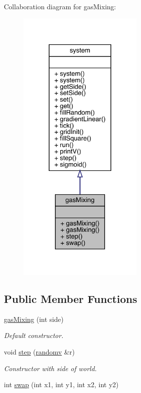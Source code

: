 Collaboration diagram for gas\+Mixing\+:
\nopagebreak
\begin{figure}[H]
\begin{center}
\leavevmode
\includegraphics[width=175pt]{classgas_mixing__coll__graph}
\end{center}
\end{figure}
\subsection*{Public Member Functions}
\begin{DoxyCompactItemize}
\item 
\mbox{\label{classgas_mixing_a5600907d75cc72807e733e34e6fae5b1}} 
\hyperlink{classgas_mixing_a5600907d75cc72807e733e34e6fae5b1}{gas\+Mixing} (int side)
\begin{DoxyCompactList}\small\item\em Default constructor. \end{DoxyCompactList}\item 
void \hyperlink{classgas_mixing_acfd89f15487611dd77da9664642a06c6}{step} (\hyperlink{classrandomv}{randomv} \&r)
\begin{DoxyCompactList}\small\item\em Constructor with side of world. \end{DoxyCompactList}\item 
int \hyperlink{classgas_mixing_a99a14c1a13ee0ba938f4c1e22ad491b6}{swap} (int x1, int y1, int x2, int y2)
\end{DoxyCompactItemize}



